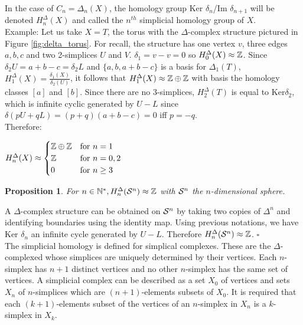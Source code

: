 \documentclass[12pt, a4paper]{article}
\newtheorem{proposition}{Proposition}
\newenvironment{proof}{{\sc Proof:}}{\hfill $\square$}
\begin{document}
In the case of $C_n = \Delta_n(X)$, the homology group Ker $\delta_n$/Im $\delta_{n+1}$ will be denoted $H^\Delta_n(X)$ and called the $n^{th}$ simplicial homology group of $X$. \\

Example: Let us take $X = T$, the torus with the $\Delta$-complex structure pictured in Figure \ref{fig:delta_torus}. For recall, the structure has one vertex $v$, three edges $a, b, c$ and two 2-simplices $U$ and $V$. $\delta_1 = v - v = 0$ so $H_0^\Delta(X) \approx \Z$. Since $\delta_2 U = a + b - c = \delta_2 L$ and $\{a, b, a+ b - c\}$ is a basis for $\Delta_1(T)$, $H_1^\Delta(X) = \frac{\delta_1(X)}{\delta_2(U)}$, it follows that $H_1^\Delta(X) \approx \Z \oplus \Z$ with basis the homology classes $[a]$ and $[b]$. Since there are no 3-simplices, $H_2^\Delta(T)$ is equal to Ker$\delta_2$, which is infinite cyclic generated by $U-L$ since $\delta(pU+qL) = (p+q)(a+b-c) = 0$ iff $p = -q$.\\

Therefore:
\begin{center}
  $H_n^\Delta(X) \approx
  \begin{cases}
    \Z \oplus \Z &\text{for $n=1$}\\
    \Z &\text{for $n=0,2$}\\
    0 &\text{for $n\ge3$}
  \end{cases}$
\end{center}

\begin{proposition}
  For $n \in \N^*, H_n^\Delta(\S^n) \approx \Z$ with $\S^n$ the $n$-dimensional sphere.
\end{proposition}
\begin{proof}
A $\Delta$-complex structure can be obtained on $\S^n$ by taking two copies of $\Delta^n$ and identifying boundaries using the identity map. Using previous notations, we have Ker $\delta_n$ an infinite cycle generated by $U-L$. Therefore $H_n^\Delta(\S^n) \approx \Z$.
\end{proof}\\

The simplicial homology is defined for simplical complexes. These are the $\Delta$-complexed whose simplices are uniquely determined by their vertices. Each $n$-simplex has $n+1$ distinct vertices and no other $n$-simplex has the same set of vertices. A simplicial complex can be described as a set $X_0$ of vertices and sets $X_n$ of $n$-simplices which are $(n+1)$-elements subsets of $X_0$. It is required that each $(k+1)$-elements subset of the vertices of an $n$-simplex in $X_n$ is a $k$-simplex in $X_k$.\\
\end{document}
